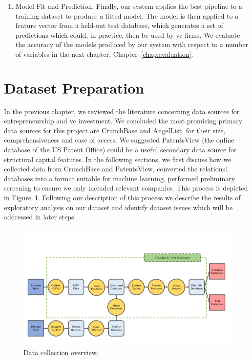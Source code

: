\documentclass[../thesis/thesis.tex]{subfiles}
\begin{document}
\begin{enumerate}
\item Model Fit and Prediction. Finally, our system applies the best pipeline to a training dataset to produce a fitted model. The model is then applied to a feature vector from a held-out test database, which generates a set of predictions which could, in practice, then be used by \gls{vc} firms. We evaluate the accuracy of the models produced by our system with respect to a number of variables in the next chapter, Chapter~\ref{chap:evaluation}.

\end{enumerate}

\section{Dataset Preparation}

In the previous chapter, we reviewed the literature concerning data sources for entrepreneurship and \gls{vc} investment. We concluded the most promising primary data sources for this project are CrunchBase and AngelList, for their size, comprehensiveness and ease of access. We suggested PatentsView (the online database of the US Patent Office) could be a useful secondary data source for structural capital features. In the following sections, we first discuss how we collected data from CrunchBase and PatentsView, converted the relational databases into a format suitable for machine learning, performed preliminary screening to ensure we only included relevant companies. This process is depicted in Figure~\ref{fig:design:data_collection}. Following our description of this process we describe the results of exploratory analysis on our dataset and identify dataset issues which will be addressed in later steps.

\begin{figure}[!htb] %
    \centering
    \includegraphics[width=\textwidth]{../figures/design/flowchart_data_collection}
    \caption[Data collection flowchart]{Data collection overview.}
    \label{fig:design:data_collection}
\end{figure}
\end{document}
